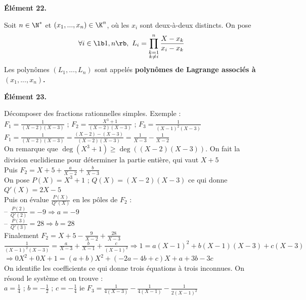 \documentclass[11pt]{article}
\begin{document}
\begin{center}
    \bf{Élément 22.}
\end{center}

\begin{defi}{}{}
    Soit $n\in\N^*$ et $(x_1,...,x_n)\in\K^n$, où les $x_i$ sont deux-à-deux distincts. On pose
    \begin{equation*}
        \forall i \in \lb1,n\rb, ~ L_i = \prod_{\substack{k=1\\k\neq i}}^n\frac{X-x_k}{x_i-x_k}
    \end{equation*}
    Les polynômes $(L_1,...,L_n)$ sont appelés \bf{polynômes de Lagrange} associés à $(x_1,...,x_n)$.
\end{defi}

\begin{center}
    \bf{Élément 23.}
\end{center}

\begin{ex}{}{}
    Décomposer des fractions rationnelles simples. Exemple :\\
    $F_1 = \frac{1}{(X-2)(X-3)}$ ; $F_2 = \frac{X^3+1}{(X-2)(X-3)} $ ; $F_3 = \frac{1}{(X-1)^2(X-3)}$
    \tcblower
    $F_1 = \frac{1}{(X-2)(X-3)} = \frac{(X-2)-(X-3)}{(X-2)(X-3)} = \frac{1}{X-3} - \frac{1}{X-2}$\\
    On remarque que $\deg(X^3+1) \ge \deg((X-2)(X-3))$. On fait la division euclidienne pour déterminer la partie entière, qui vaut $X+5$\\
    Puis $F_2 = X + 5 + \frac{a}{X-2} + \frac{b}{X-3}$\\
    On pose $P(X) = X^3 + 1$ ; $Q(X) = (X-2)(X-3)$ ce qui donne $Q'(X) = 2X-5$\\
    Puis on évalue $\frac{P(X)}{Q'(X)}$ en les pôles de $F_2$ :\\
    -- $\frac{P(2)}{Q'(2)} = -9 \Rightarrow a = -9$\\
    -- $\frac{P(3)}{Q'(3)} = 28 \Rightarrow b = 28$\\
    Finalement $F_2 = X + 5 - \frac{9}{X-2} + \frac{28}{X-3}$\\
    $\frac{1}{(X-1)^2(X-3)} = \frac{a}{X-3} + \frac{b}{X-1} + \frac{c}{(X-1)^2} \Rightarrow 1 = a(X-1)^2 + b(X-1)(X-3) + c(X-3)$\\
    $\Rightarrow 0X^2 + 0X + 1 = (a+b)X^2 + (-2a-4b+c)X + a + 3b-3c$\\
    On identifie les coefficients ce qui donne trois équations à trois inconnues. On résoud le système et on trouve :\\
    $a = \frac 1 4$ ; $b = -\frac 1 2$ ; $c = -\frac 1 4$ ie $F_3 = \frac{1}{4(X-3)} - \frac{1}{4(X-1)} - \frac{1}{2(X-1)^2}$
\end{ex}
\end{document}
